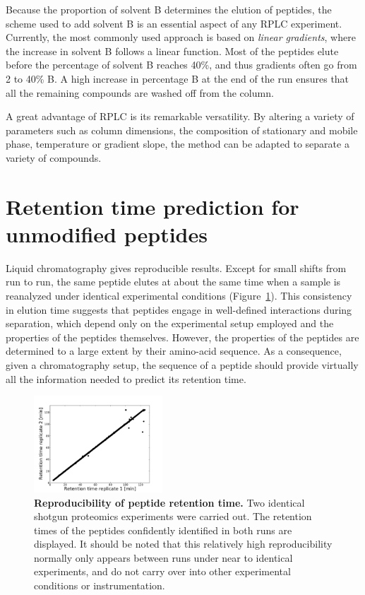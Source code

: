 \documentclass[a4paper]{article}
\begin{document}
Because the proportion of solvent B determines the elution of
peptides, the scheme used to add solvent B is an essential aspect of
any RPLC experiment. Currently, the most commonly used approach is
based on {\em linear gradients}, where the increase in solvent B
follows a linear function. Most of the peptides elute before the
percentage of solvent B reaches 40\%, and thus gradients often go from
2 to 40\% B. A high increase in percentage B at the end of the run
ensures that all the remaining compounds are washed off from the
column.

A great advantage of RPLC is its remarkable versatility. By altering a
variety of parameters such as column dimensions, the composition of
stationary and mobile phase, temperature or gradient slope, the method
can be adapted to separate a variety of compounds.

\section{\label{sec:rtpred}Retention time prediction for unmodified peptides}

Liquid chromatography gives reproducible results. Except for small
shifts from run to run, the same peptide elutes at about the same time
when a sample is reanalyzed under identical experimental conditions
(Figure~\ref{fig:repr}). This consistency in elution time suggests
that peptides engage in well-defined interactions during separation,
which depend only on the experimental setup employed and the
properties of the peptides themselves. However, the properties of the
peptides are determined to a large extent by their amino-acid
sequence. As a consequence, given a chromatography setup, the sequence
of a peptide should provide virtually all the information needed to
predict its retention time.


\begin{figure}[p]
\centering
\includegraphics[trim=0.5cm 0cm 2cm 1.5cm, clip=true, width=0.43\textwidth]{img/reproducibility.pdf}
\caption{\label{fig:repr} {\bf Reproducibility of peptide retention
    time.} Two identical shotgun proteomics experiments were carried
  out. The retention times of the peptides confidently identified in
  both runs are displayed. It should be noted that this relatively high reproducibility normally only appears between runs under near to identical experiments, and do not carry over into other experimental conditions or instrumentation.}
\end{figure}
\end{document}
